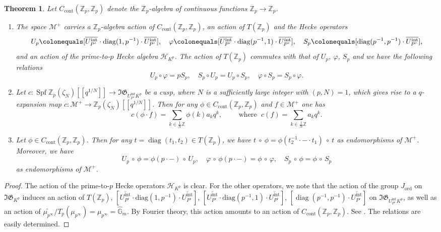 \documentclass[10pt, oneside]{amsart}
\newcommand{\defeq}{\colonequals}
\renewcommand{\tilde}{\widetilde}
\numberwithin{equation}{subsection}
\newtheorem{thm}[equation]{Theorem}
\theoremstyle{definition}
\theoremstyle{remark}
\newcommand{\mbb}[1]{\mathbb{#1}}
\newcommand{\opn}[1]{\operatorname{#1}}
\def\Z{{\mathbb{Z}}}
\begin{document}
\begin{thm} \label{PropertiesOfpadicmfsThm}
Let $C_{\opn{cont}}(\mbb{Z}_p, \mbb{Z}_p)$ denote the $\mbb{Z}_p$-algebra of continuous functions $\mbb{Z}_p \to \mbb{Z}_p$.
\begin{enumerate} 
\item The space $\mathscr{M}^+$ carries a $\mbb{Z}_p$-algebra action of $C_{\opn{cont}}(\Z_p, \Z_p)$, an action of $T(\mbb{Z}_p)$ and the Hecke operators
\[
U_p \defeq [\overline{U_{P'}^{\opn{int}}} \cdot \mathrm{diag}(1, p^{-1}) \cdot \overline{U_{P'}^{\opn{int}}}], \quad \varphi \defeq [\overline{U_{P'}^{\opn{int}}} \cdot \mathrm{diag}(p^{-1}, 1) \cdot \overline{U_{P'}^{\opn{int}}}], \quad S_p \defeq [\opn{diag}(p^{-1}, p^{-1}) \cdot \overline{U_{P'}^{\opn{int}}}],
\]
and an action of the prime-to-$p$ Hecke algebra $\mathcal{H}_{K^p}$. The action of $T(\Z_p)$ commutes with that of $U_p$, $\varphi$, $S_p$ and we have the following relations 
\[
U_p \circ \varphi = p S_p, \quad S_p \circ U_p = U_p \circ S_p, \quad \varphi \circ S_p = S_p \circ \varphi.
\] 
\item Let $c \colon \opn{Spf} \Z_p(\zeta_N)[[q^{1/N}]] \rightarrow \mathfrak{IG}_{U_{P'}^{\opn{int}}K^p}$ be a cusp, where $N$ is a sufficiently large integer with $(p, N) = 1$, which gives rise to a $q$-expansion map $c \colon \mathscr{M}^+ \to \Z_p(\zeta_N)[[q^{1/N}]]$. Then for any $\phi \in C_{\opn{cont}}(\mbb{Z}_p, \mbb{Z}_p)$ and $f \in \mathscr{M}^+$ one has
\[
c(\phi \cdot f) = \sum_{k \in \frac{1}{N}\mbb{Z}} \phi(k) a_k q^k, \quad \quad \text{ where } \; c(f) = \sum_{k \in \frac{1}{N}\mbb{Z}} a_k q^k .
\]
\item Let $\phi \in C_{\opn{cont}}(\mbb{Z}_p, \mbb{Z}_p)$. Then for any $t = \opn{diag}(t_1, t_2) \in T(\Z_p)$, we have $t ~ \circ ~ \phi = \phi( t_2^{-1} \cdot - \cdot t_1) ~ \circ ~  t$ as endomorphisms of $\mathscr{M}^+$. Moreover, we have 
\[
U_p \, \circ \, \phi = \phi(p \cdot -) \, \circ \, U_p, \quad \varphi \, \circ \, \phi(p \cdot -) = \phi \, \circ \, \varphi, \quad S_p \, \circ \, \phi = \phi \, \circ \, S_p
\]
as endomorphisms of $\mathscr{M}^+$.
\end{enumerate}
\end{thm}
\begin{proof}
The action of the prime-to-$p$ Hecke operators $\mathcal{H}_{K^p}$ is clear. For the other operators, we note that the action of the group $J_{\opn{ord}}$ on $\mathfrak{IG}_{K^p}$ induces an action of 
$T(\Z_p)$, $[\overline{U_{P'}^{\opn{int}}} \cdot \mathrm{diag}(1, p^{-1}) \cdot \overline{U_{P'}^{\opn{int}}}]$,  $[\overline{U_{P'}^{\opn{int}}} \cdot \mathrm{diag}(p^{-1}, 1) \cdot \overline{U_{P'}^{\opn{int}}}]$, $[\opn{diag}(p^{-1}, p^{-1}) \cdot \overline{U_{P'}^{\opn{int}}}]$ on $\mathfrak{IG}_{U_{P'}^{\opn{int}}K^p}$, as well as an action of $\tilde{\mu_{p^{\infty}}}/T_p(\mu_{p^{\infty}}) = \mu_{p^\infty} = \widehat{\mbb{G}}_m$. By Fourier theory, this action amounts to an action of $C_{\opn{cont}}(\mbb{Z}_p, \mbb{Z}_p)$. See \cite[\S 7.1]{howe2020unipotent}. The relations are easily determined. 
\end{proof}
\end{document}
